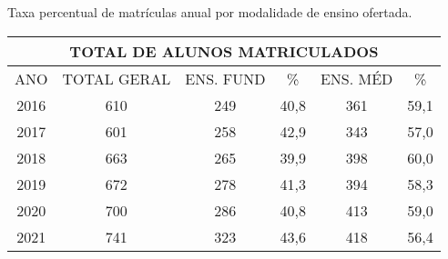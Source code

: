 \begin{quadro}[ht!]    
    \caption{Taxa percentual de matrículas anual por modalidade de ensino ofertada.}
    \label{qua:totalMatricula}
    \begin{tabular}{|cccccc|}
        \hline
        \multicolumn{6}{|c|}{\textbf{TOTAL DE ALUNOS MATRICULADOS}}                                                                                    \\ \hline
        \multicolumn{1}{|c|}{ANO} &
        \multicolumn{1}{c|}{TOTAL GERAL} &
        \multicolumn{1}{c|}{ENS. FUND} &
        \multicolumn{1}{c|}{\%} &
        \multicolumn{1}{c|}{ENS. MÉD} &
        \% \\ \hline
        \multicolumn{1}{|c|}{2016} & \multicolumn{1}{c|}{610} & \multicolumn{1}{c|}{249} & \multicolumn{1}{c|}{40,8} & \multicolumn{1}{c|}{361} & 59,1 \\ \hline
        \multicolumn{1}{|c|}{2017} & \multicolumn{1}{c|}{601} & \multicolumn{1}{c|}{258} & \multicolumn{1}{c|}{42,9} & \multicolumn{1}{c|}{343} & 57,0 \\ \hline
        \multicolumn{1}{|c|}{2018} & \multicolumn{1}{c|}{663} & \multicolumn{1}{c|}{265} & \multicolumn{1}{c|}{39,9} & \multicolumn{1}{c|}{398} & 60,0 \\ \hline
        \multicolumn{1}{|c|}{2019} & \multicolumn{1}{c|}{672} & \multicolumn{1}{c|}{278} & \multicolumn{1}{c|}{41,3} & \multicolumn{1}{c|}{394} & 58,3 \\ \hline
        \multicolumn{1}{|c|}{2020} & \multicolumn{1}{c|}{700} & \multicolumn{1}{c|}{286} & \multicolumn{1}{c|}{40,8} & \multicolumn{1}{c|}{413} & 59,0 \\ \hline
        \multicolumn{1}{|c|}{2021} & \multicolumn{1}{c|}{741} & \multicolumn{1}{c|}{323} & \multicolumn{1}{c|}{43,6} & \multicolumn{1}{c|}{418} & 56,4 \\ \hline
    \end{tabular}
\end{quadro}

